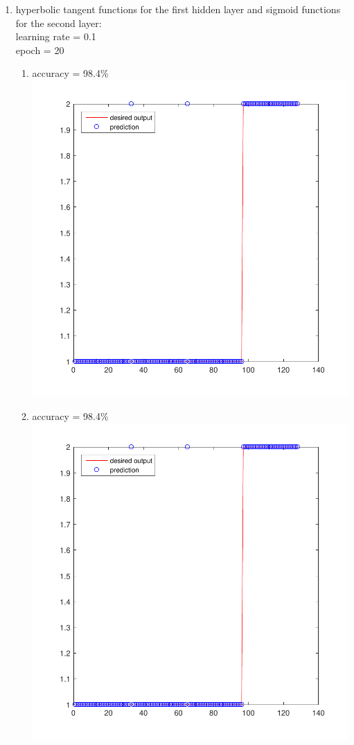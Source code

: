 \documentclass[12pt,a4paper]{article}
\begin{document}
\begin{CJK}{UTF8}{bsmi}
\begin{enumerate}
\begin{enumerate}
\begin{enumerate}
\begin{enumerate}
			\newpage	
		\end{enumerate}
		\item hyperbolic tangent functions for the first hidden layer and sigmoid functions for the second layer:
		\\
		learning rate = 0.1 \\
		epoch = 20
		\begin{enumerate}
			\item accuracy = 98.4\%\ \\
			\includegraphics[scale=0.6]{breasths1}
			\newpage	
			\item accuracy = 98.4\%\ \\
			\includegraphics[scale=0.6]{breasths1}	

\end{enumerate}
\end{enumerate}
\end{enumerate}
\end{enumerate}
\end{CJK}
\end{document}
